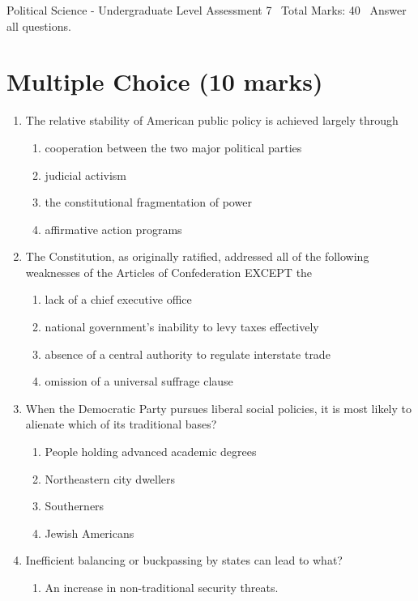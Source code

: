 \documentclass[12pt]{article}
\begin{document}
\begin{center}
Political Science - Undergraduate Level Assessment 7 \
Total Marks: 40 \
Answer all questions.
\end{center}

\section*{Multiple Choice (10 marks)}
\begin{enumerate}[label=\arabic*.]
\item The relative stability of American public policy is achieved largely through
\begin{enumerate}[label=(\alph*)]
    \item cooperation between the two major political parties
    \item judicial activism
    \item the constitutional fragmentation of power
    \item affirmative action programs
\end{enumerate}
\item The Constitution, as originally ratified, addressed all of the following weaknesses of the Articles of Confederation EXCEPT the
\begin{enumerate}[label=(\alph*)]
    \item lack of a chief executive office
    \item national government's inability to levy taxes effectively
    \item absence of a central authority to regulate interstate trade
    \item omission of a universal suffrage clause
\end{enumerate}
\item When the Democratic Party pursues liberal social policies, it is most likely to alienate which of its traditional bases?
\begin{enumerate}[label=(\alph*)]
    \item People holding advanced academic degrees
    \item Northeastern city dwellers
    \item Southerners
    \item Jewish Americans
\end{enumerate}
\item Inefficient balancing or buckpassing by states can lead to what?
\begin{enumerate}[label=(\alph*)]
    \item An increase in non-traditional security threats.

\end{enumerate}
\end{enumerate}
\end{document}
